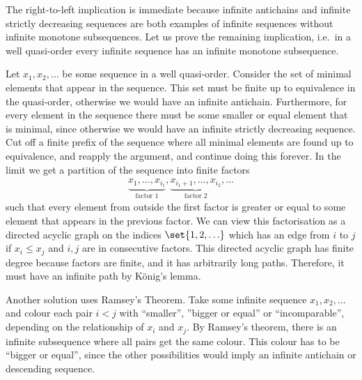 {The right-to-left implication is immediate because infinite antichains and infinite strictly decreasing sequences are both examples of infinite sequences without infinite monotone subsequences. Let us prove the remaining implication, i.e.~in a well quasi-order every infinite sequence has an infinite monotone subsequence.

Let $x_1,x_2,\ldots$ be some sequence in a well quasi-order. Consider the set of minimal elements that appear in the sequence. This set must be finite up to equivalence in the quasi-order, otherwise we would have an infinite antichain. Furthermore, for every element in the sequence there must be some smaller or equal element that is minimal, since otherwise we would have an infinite strictly decreasing sequence. Cut off a finite prefix of the sequence where all minimal elements are found up to equivalence, and reapply the argument, and continue doing this forever. In the limit we get a partition of the sequence into finite factors
\begin{align*}
 \underbrace{x_1, \ldots, x_{i_1}}_{\text{factor 1}}, \underbrace{x_{i_1+1}, \ldots, x_{i_2}}_{\text{factor 2}}, \ldots
\end{align*}
such that every element from outside the first factor is greater or equal to some element that appears in the previous factor. We can view this factorisation as a directed acyclic graph on the indices $\set{1,2,\ldots}$ which has an edge from $i$ to $j$ if $x_i \le x_j$ and $i,j$ are in consecutive factors. This directed acyclic graph has finite degree because factors are finite, and it has arbitrarily long paths. Therefore, it must have an infinite path by K\"onig's lemma.

 Another solution uses Ramsey's Theorem. Take some infinite sequence $x_1,x_2,\ldots$ and colour each pair $i < j$ with ``smaller'', ''bigger or equal'' or ``incomparable'', depending on the relationship of $x_i$ and $x_j$. By Ramsey's theorem, there is an infinite subsequence where all pairs get the same colour. This colour has to be ``bigger or equal'', since the other possibilities would imply an infinite antichain or descending sequence.}

